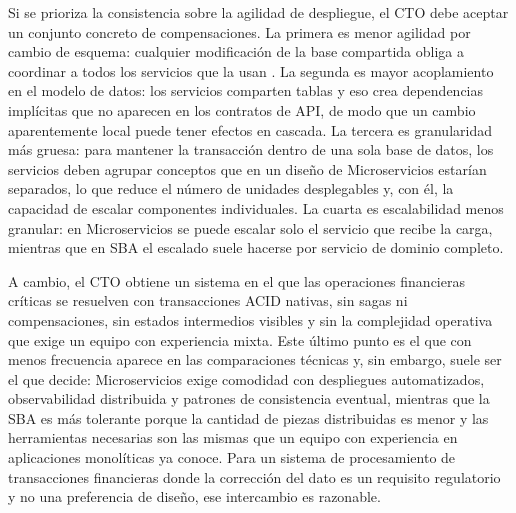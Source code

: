 Si se prioriza la consistencia sobre la agilidad de despliegue, el CTO debe aceptar un conjunto concreto de compensaciones. La primera es menor agilidad por cambio de esquema: cualquier modificación de la base compartida obliga a coordinar a todos los servicios que la usan \parencite{richards2020fundamentals}. La segunda es mayor acoplamiento en el modelo de datos: los servicios comparten tablas y eso crea dependencias implícitas que no aparecen en los contratos de API, de modo que un cambio aparentemente local puede tener efectos en cascada. La tercera es granularidad más gruesa: para mantener la transacción dentro de una sola base de datos, los servicios deben agrupar conceptos que en un diseño de Microservicios estarían separados, lo que reduce el número de unidades desplegables y, con él, la capacidad de escalar componentes individuales. La cuarta es escalabilidad menos granular: en Microservicios se puede escalar solo el servicio que recibe la carga, mientras que en SBA el escalado suele hacerse por servicio de dominio completo.

A cambio, el CTO obtiene un sistema en el que las operaciones financieras críticas se resuelven con transacciones ACID nativas, sin sagas ni compensaciones, sin estados intermedios visibles y sin la complejidad operativa que exige un equipo con experiencia mixta. Este último punto es el que con menos frecuencia aparece en las comparaciones técnicas y, sin embargo, suele ser el que decide: Microservicios exige comodidad con despliegues automatizados, observabilidad distribuida y patrones de consistencia eventual, mientras que la SBA es más tolerante porque la cantidad de piezas distribuidas es menor y las herramientas necesarias son las mismas que un equipo con experiencia en aplicaciones monolíticas ya conoce. Para un sistema de procesamiento de transacciones financieras donde la corrección del dato es un requisito regulatorio y no una preferencia de diseño, ese intercambio es razonable.